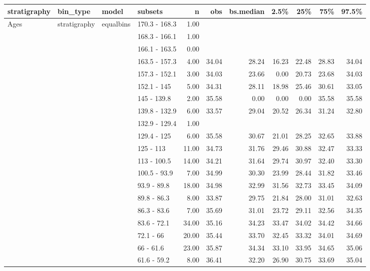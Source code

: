\begin{longtable}{llllrrrrrrr}
  \hline
stratigraphy & bin\_type & model & subsets & n & obs & bs.median & 2.5\% & 25\% & 75\% & 97.5\% \\ 
  \hline
Ages & stratigraphy & equalbins & 170.3 - 168.3 & 1.00 &  &  &  &  &  &  \\ 
   &  &  & 168.3 - 166.1 & 1.00 &  &  &  &  &  &  \\ 
   &  &  & 166.1 - 163.5 & 0.00 &  &  &  &  &  &  \\ 
   &  &  & 163.5 - 157.3 & 4.00 & 34.04 & 28.24 & 16.23 & 22.48 & 28.83 & 34.04 \\ 
   &  &  & 157.3 - 152.1 & 3.00 & 34.03 & 23.66 & 0.00 & 20.73 & 23.68 & 34.03 \\ 
   &  &  & 152.1 - 145 & 5.00 & 34.31 & 28.11 & 18.98 & 25.46 & 30.61 & 33.05 \\ 
   &  &  & 145 - 139.8 & 2.00 & 35.58 & 0.00 & 0.00 & 0.00 & 35.58 & 35.58 \\ 
   &  &  & 139.8 - 132.9 & 6.00 & 33.57 & 29.04 & 20.52 & 26.34 & 31.24 & 32.80 \\ 
   &  &  & 132.9 - 129.4 & 1.00 &  &  &  &  &  &  \\ 
   &  &  & 129.4 - 125 & 6.00 & 35.58 & 30.67 & 21.01 & 28.25 & 32.65 & 33.88 \\ 
   &  &  & 125 - 113 & 11.00 & 34.73 & 31.76 & 29.46 & 30.88 & 32.47 & 33.33 \\ 
   &  &  & 113 - 100.5 & 14.00 & 34.21 & 31.64 & 29.74 & 30.97 & 32.40 & 33.30 \\ 
   &  &  & 100.5 - 93.9 & 7.00 & 34.99 & 30.30 & 23.99 & 28.44 & 31.82 & 33.46 \\ 
   &  &  & 93.9 - 89.8 & 18.00 & 34.98 & 32.99 & 31.56 & 32.73 & 33.45 & 34.09 \\ 
   &  &  & 89.8 - 86.3 & 8.00 & 33.87 & 29.75 & 21.84 & 28.00 & 31.01 & 32.63 \\ 
   &  &  & 86.3 - 83.6 & 7.00 & 35.69 & 31.01 & 23.72 & 29.11 & 32.56 & 34.35 \\ 
   &  &  & 83.6 - 72.1 & 34.00 & 35.16 & 34.23 & 33.47 & 34.02 & 34.42 & 34.66 \\ 
   &  &  & 72.1 - 66 & 20.00 & 35.44 & 33.70 & 32.45 & 33.32 & 34.01 & 34.69 \\ 
   &  &  & 66 - 61.6 & 23.00 & 35.87 & 34.34 & 33.10 & 33.95 & 34.65 & 35.06 \\ 
   &  &  & 61.6 - 59.2 & 8.00 & 36.41 & 32.20 & 26.90 & 30.75 & 33.69 & 35.04 \\ 

\end{longtable}
